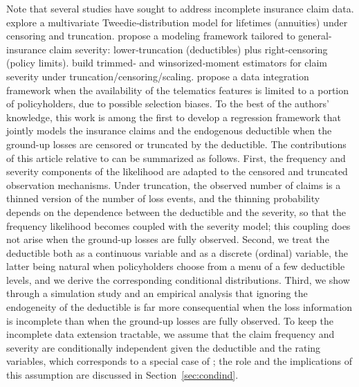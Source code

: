 \documentclass[11pt]{article}
\newcommand{\rev}[1]{{\color{blue}#1}}
\begin{document}
Note that several studies have sought to address incomplete insurance claim data. \citet{alai2015multivariate} explore a multivariate Tweedie‐distribution model for lifetimes (annuities) under censoring and truncation.  \citet{gatti2025modeling} propose a modeling framework tailored to general-insurance claim severity: lower‐truncation (deductibles) plus right‐censoring (policy limits). \citet{Poudyal2022Robust} build trimmed‐ and winsorized‐moment estimators for claim severity under truncation/censoring/scaling. \citet{peiris2024integration} propose a data integration framework when the availability of the telematics features is limited to a portion of policyholders, due to possible selection biases.  \rev{To the best of the authors' knowledge, this work is among the first to develop a regression framework that jointly models the insurance claims and the endogenous deductible when the ground-up losses are censored or truncated by the deductible. The contributions of this article relative to \citet{shi2022copula} can be summarized as follows. First, the frequency and severity components of the likelihood are adapted to the censored and truncated observation mechanisms. Under truncation, the observed number of claims is a thinned version of the number of loss events, and the thinning probability depends on the dependence between the deductible and the severity, so that the frequency likelihood becomes coupled with the severity model; this coupling does not arise when the ground-up losses are fully observed. Second, we treat the deductible both as a continuous variable and as a discrete (ordinal) variable, the latter being natural when policyholders choose from a menu of a few deductible levels, and we derive the corresponding conditional distributions. Third, we show through a simulation study and an empirical analysis that ignoring the endogeneity of the deductible is far more consequential when the loss information is incomplete than when the ground-up losses are fully observed. To keep the incomplete data extension tractable, we assume that the claim frequency and severity are conditionally independent given the deductible and the rating variables, which corresponds to a special case of \citet{shi2022copula}; the role and the implications of this assumption are discussed in Section~\ref{sec:condind}.}
\end{document}
